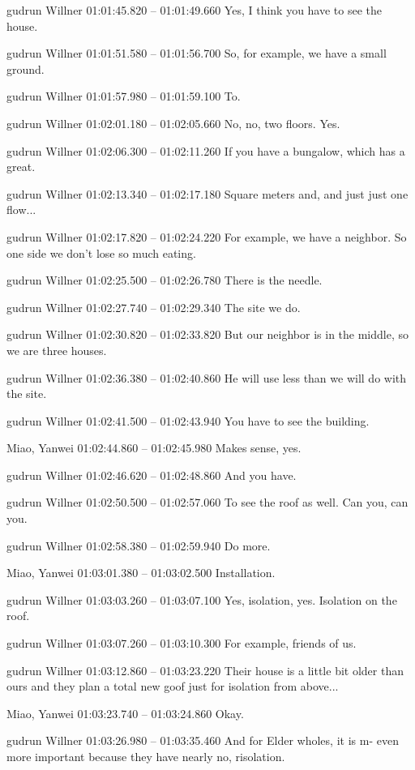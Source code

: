 {gudrun Willner 01:01:45.820 -- 01:01:49.660
Yes, I think you have to see the house.

gudrun Willner 01:01:51.580 -- 01:01:56.700
So, for example, we have a small ground.

gudrun Willner 01:01:57.980 -- 01:01:59.100
To.

gudrun Willner 01:02:01.180 -- 01:02:05.660
No, no, two floors. Yes.

gudrun Willner 01:02:06.300 -- 01:02:11.260
If you have a bungalow, which has a great.

gudrun Willner 01:02:13.340 -- 01:02:17.180
Square meters and, and just just one flow...

gudrun Willner 01:02:17.820 -- 01:02:24.220
For example, we have a neighbor. So one side we don't lose so much eating.

gudrun Willner 01:02:25.500 -- 01:02:26.780
There is the needle.

gudrun Willner 01:02:27.740 -- 01:02:29.340
The site we do.

gudrun Willner 01:02:30.820 -- 01:02:33.820
But our neighbor is in the middle, so we are three houses.

gudrun Willner 01:02:36.380 -- 01:02:40.860
He will use less than we will do with the site.

gudrun Willner 01:02:41.500 -- 01:02:43.940
You have to see the building.

Miao, Yanwei 01:02:44.860 -- 01:02:45.980
Makes sense, yes.

gudrun Willner 01:02:46.620 -- 01:02:48.860
And you have.

gudrun Willner 01:02:50.500 -- 01:02:57.060
To see the roof as well. Can you, can you.

gudrun Willner 01:02:58.380 -- 01:02:59.940
Do more.

Miao, Yanwei 01:03:01.380 -- 01:03:02.500
Installation.

gudrun Willner 01:03:03.260 -- 01:03:07.100
Yes, isolation, yes. Isolation on the roof.

gudrun Willner 01:03:07.260 -- 01:03:10.300
For example, friends of us.

gudrun Willner 01:03:12.860 -- 01:03:23.220
Their house is a little bit older than ours and they plan a total new goof just for isolation from above...

Miao, Yanwei 01:03:23.740 -- 01:03:24.860
Okay.

gudrun Willner 01:03:26.980 -- 01:03:35.460
And for Elder wholes, it is m- even more important because they have nearly no, risolation.

}
